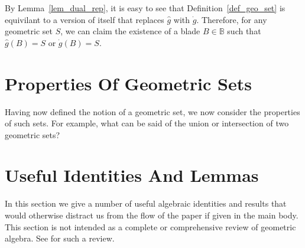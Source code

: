 \documentclass{birkjour}
\theoremstyle{definition}
\theoremstyle{remark}
\numberwithin{equation}{section}
\newcommand{\B}{\mathbb{B}}
\newcommand{\gd}{\dot{g}}
\newcommand{\gh}{\hat{g}}
\begin{document}
By Lemma~\ref{lem_dual_rep}, it is easy to see that Definition~\ref{def_geo_set} is equivilant to a version of itself that replaces $\gh$ with $\gd$.
Therefore, for any geometric set $S$, we can claim the existence of a blade $B\in\B$ such that $\gh(B)=S$ or $\gd(B)=S$.

\section{Properties Of Geometric Sets}

Having now defined the notion of a geometric set, we now consider the properties of such sets.  For example, what can be said of the
union or intersection of two geometric sets?







\section{Useful Identities And Lemmas}\label{sec_useful_identities}

In this section we give a number of useful algebraic identities and results that would otherwise distract us from the flow of the
paper if given in the main body.  This section is not intended as a complete or comprehensive review of geometric algebra.
See \cite{} for such a review.
\end{document}
